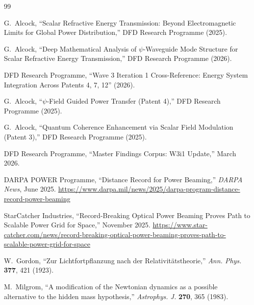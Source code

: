 \documentclass[aps,prd,twocolumn,superscriptaddress]{revtex4-2}
\begin{document}
\begin{thebibliography}{99}

G.~Alcock, ``Scalar Refractive Energy Transmission:
Beyond Electromagnetic Limits for Global Power Distribution,''
DFD Research Programme (2025).

G.~Alcock, ``Deep Mathematical Analysis of $\psi$-Waveguide Mode
Structure for Scalar Refractive Energy Transmission,''
DFD Research Programme (2026).

DFD Research Programme, ``Wave 3 Iteration 1 Cross-Reference:
Energy System Integration Across Patents 4, 7, 12'' (2026).

G.~Alcock, ``$\psi$-Field Guided Power Transfer (Patent 4),''
DFD Research Programme (2025).

G.~Alcock, ``Quantum Coherence Enhancement via Scalar Field Modulation
(Patent 3),'' DFD Research Programme (2025).

DFD Research Programme, ``Master Findings Corpus: W3i1 Update,''
March 2026.

DARPA POWER Programme, ``Distance Record for Power Beaming,''
\textit{DARPA News}, June 2025.
\url{https://www.darpa.mil/news/2025/darpa-program-distance-record-power-beaming}

StarCatcher Industries, ``Record-Breaking Optical Power Beaming
Proves Path to Scalable Power Grid for Space,'' November 2025.
\url{https://www.star-catcher.com/news/record-breaking-optical-power-beaming-proves-path-to-scalable-power-grid-for-space}

W.~Gordon, ``Zur Lichtfortpflanzung nach der Relativit\"{a}tstheorie,''
\textit{Ann. Phys.} \textbf{377}, 421 (1923).

M.~Milgrom, ``A modification of the Newtonian dynamics as a possible
alternative to the hidden mass hypothesis,''
\textit{Astrophys. J.} \textbf{270}, 365 (1983).

\end{thebibliography}
\end{document}

